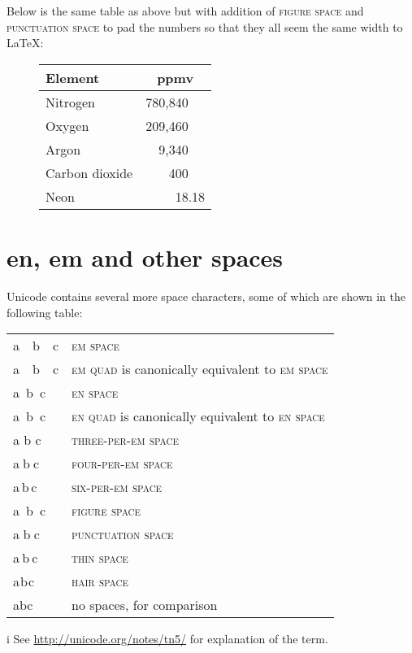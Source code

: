\documentclass{article}
\DeclareRobustCommand{\expl}[1]{\textsf{#1}}
\newcommand{\enquad}{\textsc{en quad}}
\newcommand{\enspaceC}{\textsc{en space}}
\newcommand{\emquad}{\textsc{em quad}}
\newcommand{\emspaceC}{\textsc{em space}}
\newcommand{\threePerEm}{\textsc{three-per-em space}}
\newcommand{\fourPerEm}{\textsc{four-per-em space}}
\newcommand{\sixPerEm}{\textsc{six-per-em space}}
\newcommand{\figuresp}{\textsc{figure space}}
\newcommand{\punctsp}{\textsc{punctuation space}}
\newcommand{\thinsp}{\textsc{thin space}}
\newcommand{\hairsp}{\textsc{hair space}}
\begin{document}
\expl{Below is the same table as above but with addition of \figuresp{} and
  \punctsp{} to pad the numbers so that they all seem the same width to
  \LaTeX{}:}

\begin{figure}[H]
\centering
\begin{tabular}{l | c}
  Element & ppmv \tabularnewline
  \hline
  Nitrogen &      780,840   \tabularnewline
  Oxygen &        209,460   \tabularnewline
  Argon &           9,340   \tabularnewline
  Carbon dioxide &    400   \tabularnewline
  Neon &               18.18
\end{tabular}
\end{figure}

\pagebreak

\section{en, em and other spaces}

\expl{Unicode contains several more space characters, some of which are shown in
the following table:}

\begin{center}
\begin{threeparttable}
\begin{tabular}[c]{l | >{\raggedright}p{}}
  a b c & \expl{\emspaceC{}}\tabularnewline
  a b c & \expl{\emquad{} is canonically equivalent{\tnote{i} } to \emspaceC{}}\tabularnewline
  a b c & \expl{\enspaceC{}}\tabularnewline
  a b c & \expl{\enquad{} is canonically equivalent{\tnote{i} } to \enspaceC{}}\tabularnewline
  a b c & \expl{\threePerEm{}}\tabularnewline
  a b c & \expl{\fourPerEm{}}\tabularnewline
  a b c & \expl{\sixPerEm{}}\tabularnewline
  a b c & \expl{\figuresp{}}\tabularnewline
  a b c & \expl{\punctsp{}}\tabularnewline
  a b c & \expl{\thinsp{}}\tabularnewline
  a b c & \expl{\hairsp{}}\tabularnewline
  abc   & \expl{no spaces, for comparison}\tabularnewline
\end{tabular}
\begin{tablenotes}
\item[\expl{i}] \expl{\footnotesize See \url{http://unicode.org/notes/tn5/}
    for explanation of the term.}
\end{tablenotes}
\end{threeparttable}
\end{center}

\pagebreak
\end{document}
